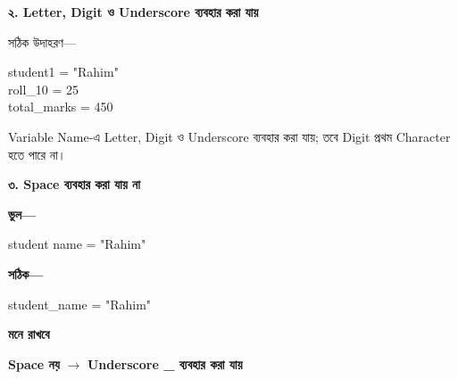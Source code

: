 \textbf{\color{darkTeal}২. Letter, Digit ও Underscore ব্যবহার করা যায়}

সঠিক উদাহরণ—

\begin{codebox}

\begin{english}
\ttfamily
student1 = "Rahim"\\
roll\_10 = 25\\
total\_marks = 450
\end{english}

\end{codebox}

Variable Name-এ Letter, Digit ও Underscore ব্যবহার করা যায়;
তবে Digit প্রথম Character হতে পারে না।


\textbf{\color{darkTeal}৩. Space ব্যবহার করা যায় না}

\textbf{ভুল—}

\begin{codebox}

\begin{english}
\ttfamily
student name = "Rahim"
\end{english}

\end{codebox}

\textbf{সঠিক—}

\begin{codebox}

\begin{english}
\ttfamily
student\_name = "Rahim"
\end{english}

\end{codebox}

\begin{rememberbox}

\textbf{\color{deepOrange}মনে রাখবে}

\begin{center}

\textbf{Space নয়}
\(\longrightarrow\)
\textbf{Underscore \textenglish{\ttfamily \_} ব্যবহার করা যায়}

\end{center}

\end{rememberbox}


